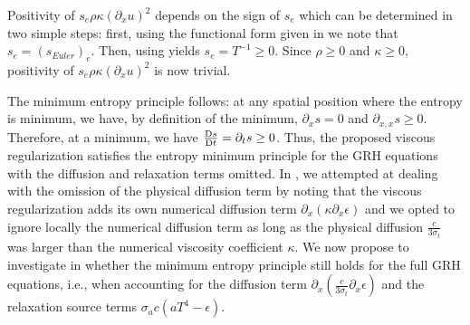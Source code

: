 \documentclass[times,doublespace]{fldauth}%
\begin{document}
Positivity of $s_e \rho \kappa (\partial_x u)^2$ depends on the sign of $s_e$ which can be determined in two simple 
steps: first, using the functional form given in  we note that $s_e = (s_{Euler})_e$. Then, using 
 yields $s_e = T^{-1} \geq 0$. Since $\rho \geq 0$ and $\kappa \geq 0$, positivity of 
$s_e \rho \kappa (\partial_x u)^2$ is now trivial.

The minimum entropy principle follows: at any spatial position where the entropy is minimum, we have, by definition of 
the minimum, $\partial_x s =0$ and $\partial_{x,x} s \geq 0$. Therefore, at a minimum, we have 
$\frac{\textrm{D} s}{\textrm{D} t}=\partial_t s \geq 0$. Thus, the proposed viscous regularization satisfies the entropy minimum principle for 
the GRH equations with the diffusion and relaxation terms omitted. In \cite{our_jcp_radhy_paper}, we attempted at 
dealing with the omission of the physical diffusion term by noting that the 
viscous regularization adds its own numerical diffusion term $\partial_x \left( \kappa \partial_x \epsilon \right)$ and 
we opted to ignore locally the numerical diffusion term as long as the physical diffusion $\frac{c}{3 \sigma_t}$ was 
larger than the numerical viscosity coefficient $\kappa$. 
%
We now propose to investigate in  whether the minimum entropy principle still holds for the full 
GRH equations, i.e., when accounting for the diffusion term
$\partial_x \left( \frac{c}{3 \sigma_t} \partial_x \epsilon \right)$ and the relaxation source terms
$\sigma_a c \left( a T^4 - \epsilon \right)$.
%
\end{document}
